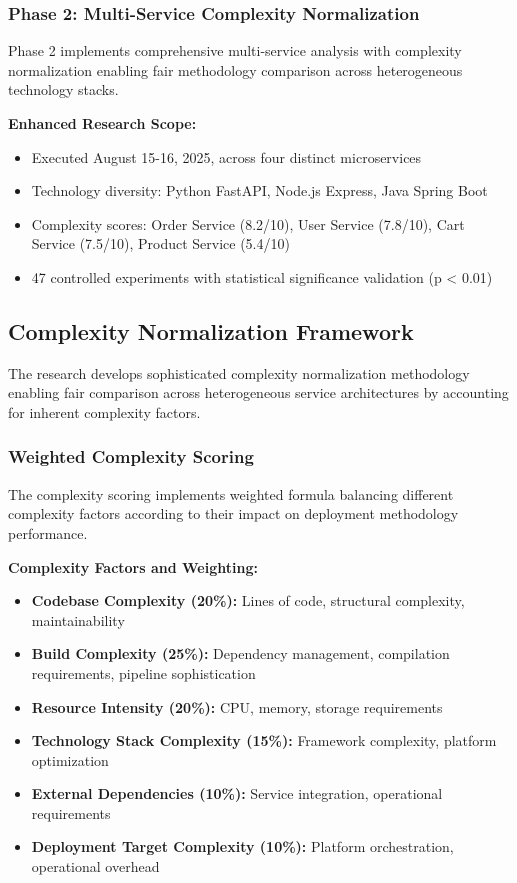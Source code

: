 \subsubsection{Phase 2: Multi-Service Complexity Normalization}

Phase 2 implements comprehensive multi-service analysis with complexity normalization enabling fair methodology comparison across heterogeneous technology stacks.

\textbf{Enhanced Research Scope:}
\begin{itemize}
\item Executed August 15-16, 2025, across four distinct microservices
\item Technology diversity: Python FastAPI, Node.js Express, Java Spring Boot
\item Complexity scores: Order Service (8.2/10), User Service (7.8/10), Cart Service (7.5/10), Product Service (5.4/10)
\item 47 controlled experiments with statistical significance validation (p < 0.01)
\end{itemize}

\subsection{Complexity Normalization Framework}

The research develops sophisticated complexity normalization methodology enabling fair comparison across heterogeneous service architectures by accounting for inherent complexity factors.

\subsubsection{Weighted Complexity Scoring}

The complexity scoring implements weighted formula balancing different complexity factors according to their impact on deployment methodology performance.

\textbf{Complexity Factors and Weighting:}
\begin{itemize}
\item \textbf{Codebase Complexity (20\%):} Lines of code, structural complexity, maintainability
\item \textbf{Build Complexity (25\%):} Dependency management, compilation requirements, pipeline sophistication
\item \textbf{Resource Intensity (20\%):} CPU, memory, storage requirements
\item \textbf{Technology Stack Complexity (15\%):} Framework complexity, platform optimization
\item \textbf{External Dependencies (10\%):} Service integration, operational requirements
\item \textbf{Deployment Target Complexity (10\%):} Platform orchestration, operational overhead
\end{itemize}


